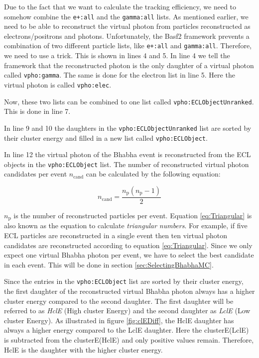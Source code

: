 \documentclass[a4paper,11pt,twosided,final,german,openbib,pdftex,listof=totoc,bibliography=totoc]{scrbook}
\begin{document}
Due to the fact that we want to calculate the tracking efficiency, we need to somehow combine the \texttt{e+:all} and the \texttt{gamma:all} lists. As mentioned earlier, we need to be able to reconstruct the virtual photon from particles reconstructed as electrons/positrons and photons.
Unfortunately, the Basf2 framework prevents a combination of two different particle lists, like \texttt{e+:all} and \texttt{gamma:all}. Therefore, we need to use a trick. This is shown in lines 4 and 5. In line 4 we tell the framework that the reconstructed photon is the only daughter of a virtual photon called \texttt{vpho:gamma}. The same is done for the electron list in line 5. Here the virtual photon is called \texttt{vpho:elec}. 

Now, these two lists can be combined to one list called \texttt{vpho:ECLObjectUnranked}. This is done in line 7.

In line 9 and 10 the daughters in the \texttt{vpho:ECLObjectUnranked} list are sorted by their cluster energy and filled in a new list called \texttt{vpho:ECLObject}.

In line 12 the virtual photon of the Bhabha event is reconstructed from the ECL objects in the \texttt{vpho:ECLObject} list. The number of reconstructed virtual photon candidates per event $n_{\textrm{cand}}$ can be calculated by the following equation\cite{triangular}:

\begin{equation}
n_{\textrm{cand}} = \frac{n_{\textrm{p}}(n_{\textrm{p}} -1)}{2}
\label{eq:Triangular}
\end{equation}

$n_{\textrm{p}}$ is the number of reconstructed particles per event. Equation \ref{eq:Triangular} is also known as the equation to calculate \textit{triangular numbers}. For example, if five ECL particles are reconstructed in a single event then ten virtual photon candidates are reconstructed according to equation \ref{eq:Triangular}. Since we only expect one virtual Bhabha photon per event, we have to select the best candidate in each event. This will be done in section \ref{sec:SelectingBhabhaMC}.

Since the entries in the \texttt{vpho:ECLObject} list are sorted by their cluster energy, the first daughter of the reconstructed virtual Bhabha photon always has a higher cluster energy compared to the second daughter. The first daughter will be referred to as \textit{HclE} (High cluster Energy) and the second daughter as \textit{LclE} (Low cluster Energy). As illustrated in figure \ref{fig:clEDiff}, the HclE daughter has always a higher energy compared to the LclE daughter. Here the clusterE(LclE) is subtracted from the clusterE(HclE) and only positive values remain. Therefore, HclE is the daughter with the higher cluster energy.
\end{document}
